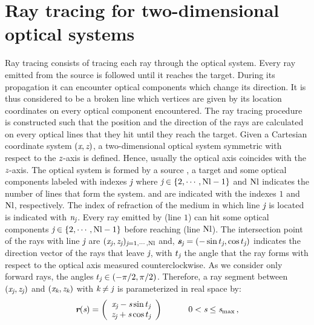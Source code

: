 \section{Ray tracing for two-dimensional optical systems}\label{sec:raytracing}
Ray tracing consists of tracing each ray through the optical system. 
Every ray emitted from the source is followed until it reaches the target. During its propagation it can encounter optical components which change its direction. 
It is thus considered to be a broken line which vertices are given by its location coordinates on every optical component encountered. 
The ray tracing procedure is constructed such that the position and the direction of the rays are calculated on every optical lines that they hit until they reach the target.
Given a Cartesian coordinate system $(\textit{x}, \textit{z})$, a two-dimensional optical system symmetric with respect to the $\textit{z}$-axis is defined.
Hence, usually the optical axis coincides with the $\textit{z}$-axis.
The optical system is formed by a source , a target   and some optical components labeled with indexes $\textit{j}$ where $\textit{j} \in \{2, \cdots, \textrm{Nl}-1\}$ and $\textrm{Nl}$
 indicates the number of lines that form the system.  and  are indicated with the indexes $1$ and $\textrm{Nl}$, respectively.
The index of refraction of the medium in which line $\textit{j}$ is located is indicated with $\textit{n}_{\textit{j}}$.
Every ray emitted by  (line $1$) can hit some optical components $\textit{j}\in\{2, \cdots, \textrm{Nl} -1\}$ before reaching  (line $\textrm{Nl}$).
The intersection point of the rays with line $\textit{j}$ are $(\textit{x}_{\textit{j}}, \textit{z}_{\textit{j}})_{\textit{j} =1, \cdots, \textrm{Nl}}$ and, $\textit{\textbf{s}}_{\textit{j}}= (-\sin t_{\textit{j}}, \cos t_{\textit{j}})$ indicates the direction vector of the rays that leave $\textit{j}$,
with $t_{\textit{j}}$ the angle that the ray forms with respect to the optical axis measured counterclockwise. As we consider only forward rays, the angles
$t_{\textit{j}}\in (-\pi/2, \pi/2)$.
Therefore, a ray segment between $(\textit{x}_{\textit{j}}, \textit{z}_{\textit{j}})$ and $(\textit{x}_{\textit{k}}, \textit{z}_{\textit{k}})$
with $\textit{k}\neq\textit{j}$ is parameterized in real space by:
\begin{equation}
\label{parametrization}
\textit{\textbf{r}}(\textit{s})=
\left( \begin{array}{cc}
\textit{x}_{\textit{j}}-\textit{s}\sin t_{\textit{j}} \\
\textit{z}_{\textit{j}}+\textit{s}\cos t_{\textit{j}}\end{array} \right) \qquad \quad 0< \textit{s}\leq \textit{s}_{\textrm{max}}\,,
\end{equation}
